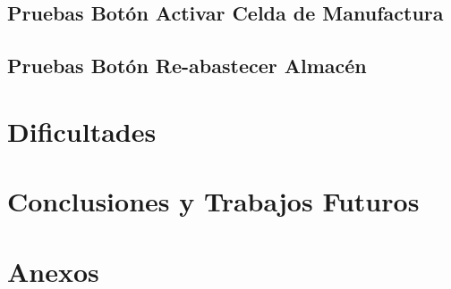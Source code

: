 \documentclass{thesis-tg-ie-pujc} %
\begin{document}
\section{Pruebas Botón Activar Celda de Manufactura}

\section{Pruebas Botón Re-abastecer Almacén}


\chapter{Dificultades}


\chapter{Conclusiones y Trabajos Futuros}


\chapter{Anexos}






\end{document}
